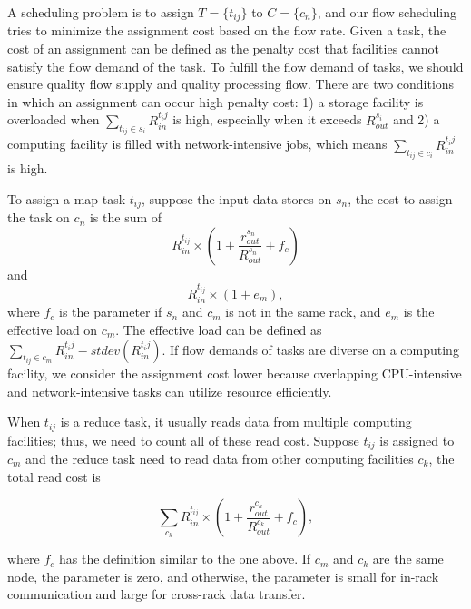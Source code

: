 A scheduling problem is to assign $T=\{t_{ij}\}$ to $C=\{c_{n}\}$, and our flow scheduling tries to minimize the assignment cost based on the flow rate.
Given a task, the cost of an assignment can be defined as the penalty cost that facilities cannot satisfy the flow demand of the task.
To fulfill the flow demand of tasks, we should ensure quality flow supply and quality processing flow.
There are two conditions in which an assignment can occur high penalty cost:
1) a storage facility is overloaded when $\sum_{t_{ij} \in s_i} R^{t_ij}_{in}$ is high, especially when it exceeds $R^{s_{i}}_{out}$
and
2) a computing facility is filled with network-intensive jobs, which means $\sum_{t_{ij} \in c_i} {R^{t_ij}_{in}}$ is high.

To assign a map task $t_{ij}$, suppose the input data stores on $s_n$, the cost to assign the task on $c_n$ is the sum of
\begin{equation*}
R^{t_{ij}}_{in} \times (1+\frac{r^{s_n}_{out}}{R^{s_n}_{out}}+f_{c})
\end{equation*}
and
\begin{equation*}
R^{t_{ij}}_{in} \times (1+e_{m}),
\end{equation*}
where $f_{c}$ is the parameter if $s_n$ and $c_m$ is not in the same rack, and $e_{m}$ is the effective load on $c_m$.
The effective load can be defined as $\sum_{t_{ij} \in c_m} {R^{t_ij}_{in}} - stdev(R^{t_ij}_{in})$.
If flow demands of tasks are diverse on a computing facility, we consider the assignment cost lower because overlapping CPU-intensive and network-intensive tasks can utilize resource efficiently.

When $t_{ij}$ is a reduce task, it usually reads data from multiple computing facilities; thus, we need to count all of these read cost.
Suppose $t_{ij}$ is assigned to $c_{m}$ and the reduce task need to read data from other computing facilities $c_k$, the total read cost is

\begin{equation*}
\sum_{c_{k}} R^{t_{ij}}_{in} \times (1+\frac{r^{c_k}_{out}}{R^{c_k}_{out}}+f_{c}),
\end{equation*}

where $f_c$ has the definition similar to the one above.
If $c_m$ and $c_k$ are the same node, the parameter is zero, and otherwise, the parameter is small for in-rack communication and large for cross-rack data transfer.


